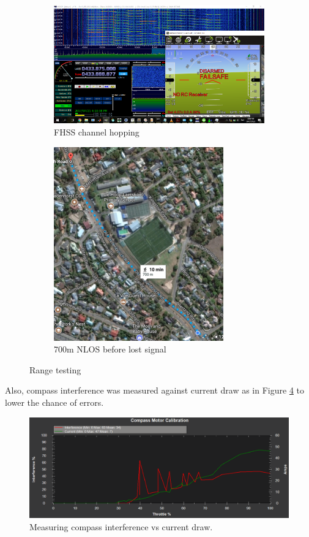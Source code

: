 \begin{figure}[H]
\begin{subfigure}{0.5\textwidth}
\centering
\includegraphics[scale=0.45]{images/range_test.PNG}
\caption{FHSS channel hopping}
\label{fig:range_test}
\end{subfigure}
\begin{subfigure}{0.5\textwidth}
\centering
\includegraphics[scale=0.8]{images/range_test_700m.PNG}
\caption{700m NLOS before lost signal}
\label{fig:range_test_700m}
\end{subfigure}
\caption{Range testing}
\label{fig:range}
\end{figure}

Also, compass interference was measured against current draw as in Figure \ref{fig:interference} to lower the chance of errors.

\begin{figure}[H]
\centering
\includegraphics[scale=0.35]{images/comp_mot_true_current.PNG}
\caption{Measuring compass interference vs current draw.}
\label{fig:interference}
\end{figure}


